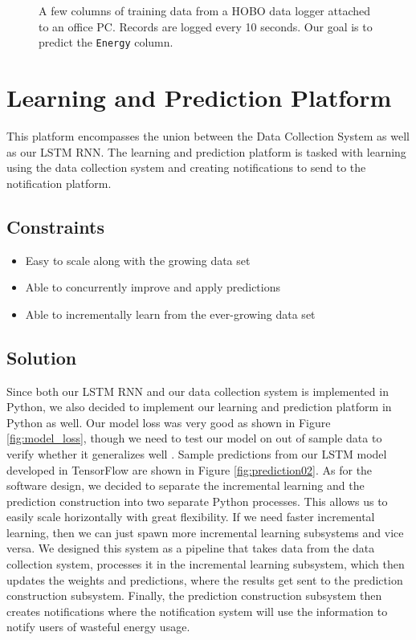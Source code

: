 \documentclass[conference]{IEEEtran}
\begin{document}
\begin{figure}[h]
	\centering
	\caption{A few columns of training data from a HOBO data logger attached to an office PC. Records are logged every 10 seconds. Our goal is to predict the \texttt{Energy} column.}
	\label{fig:data_hobo}
\end{figure}

\section{Learning and Prediction Platform}
This platform encompasses the union between the Data Collection System as well as our LSTM RNN. The learning and prediction platform is tasked with learning using the data collection system and creating notifications to send to the notification platform.

\subsection{Constraints}
\begin{itemize}
    \item Easy to scale along with the growing data set
    \item Able to concurrently improve and apply predictions
    \item Able to incrementally learn from the ever-growing data set
\end{itemize}

\subsection{Solution}
Since both our LSTM RNN and our data collection system is implemented in Python, we also decided to implement our learning and prediction platform in Python as well. Our model loss was very good as shown in Figure \ref{fig:model_loss}, though we need to test our model on out of sample data to verify whether it generalizes well \cite{b4}. Sample predictions from our LSTM model developed in TensorFlow are shown in Figure \ref{fig:prediction02}. As for the software design, we decided to separate the incremental learning and the prediction construction into two separate Python processes. This allows us to easily scale horizontally with great flexibility. If we need faster incremental learning, then we can just spawn more incremental learning subsystems and vice versa. We designed this system as a pipeline that takes data from the data collection system, processes it in the incremental learning subsystem, which then updates the weights and predictions, where the results get sent to the prediction construction subsystem. Finally, the prediction construction subsystem then creates notifications where the notification system will use the information to notify users of wasteful energy usage.
\end{document}
